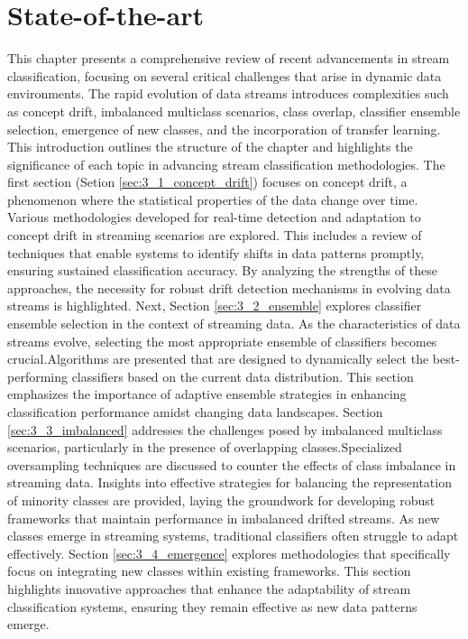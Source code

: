 \chapter{State-of-the-art}
\label{cha:3_State-of-the-art}


This chapter presents a comprehensive review of recent advancements in stream classification, focusing on several critical challenges that arise in dynamic data environments. The rapid evolution of data streams introduces complexities such as concept drift, imbalanced multiclass scenarios, class overlap, classifier ensemble selection, emergence of new classes, and the incorporation of transfer learning. This introduction outlines the structure of the chapter and highlights the significance of each topic in advancing stream classification methodologies.
The first section (Setion \ref{sec:3_1_concept_drift}) focuses on concept drift, a phenomenon where the statistical properties of the data change over time. Various methodologies developed for real-time detection and adaptation to concept drift in streaming scenarios are explored. This includes a review of techniques that enable systems to identify shifts in data patterns promptly, ensuring sustained classification accuracy. By analyzing the strengths of these approaches, the necessity for robust drift detection mechanisms in evolving data streams is highlighted. Next, Section \ref{sec:3_2_ensemble} explores classifier ensemble selection in the context of streaming data. As the characteristics of data streams evolve, selecting the most appropriate ensemble of classifiers becomes crucial.Algorithms are presented that are designed to dynamically select the best-performing classifiers based on the current data distribution. This section emphasizes the importance of adaptive ensemble strategies in enhancing classification performance amidst changing data landscapes.
Section \ref{sec:3_3_imbalanced} addresses the challenges posed by imbalanced multiclass scenarios, particularly in the presence of overlapping classes.Specialized oversampling techniques are discussed to counter the effects of class imbalance in streaming data. Insights into effective strategies for balancing the representation of minority classes are provided, laying the groundwork for developing robust frameworks that maintain performance in imbalanced drifted streams.
As new classes emerge in streaming systems, traditional classifiers often struggle to adapt effectively. Section \ref{sec:3_4_emergence} explores methodologies that specifically focus on integrating new classes within existing frameworks. This section highlights innovative approaches that enhance the adaptability of stream classification systems, ensuring they remain effective as new data patterns emerge.
